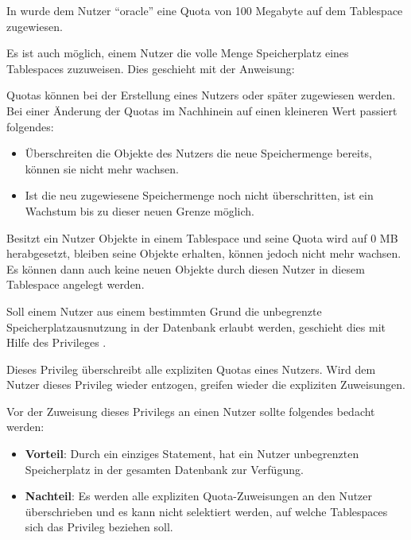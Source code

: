           In  wurde dem Nutzer \enquote{oracle} eine Quota von 100 Megabyte auf dem Tablespace  zugewiesen.
          \begin{merke}
            Es ist auch möglich, einem Nutzer die volle Menge Speicherplatz eines Tablespaces zuzuweisen. Dies geschieht mit der Anweisung: 
          \end{merke}

          Quotas können bei der Erstellung eines Nutzers oder später zugewiesen werden. Bei einer Änderung der Quotas im Nachhinein auf einen kleineren Wert passiert folgendes:
          \begin{itemize}
            \item Überschreiten die Objekte des Nutzers die neue Speichermenge bereits, können sie nicht mehr wachsen.
            \item Ist die neu zugewiesene Speichermenge noch nicht überschritten, ist ein Wachstum bis zu dieser neuen Grenze möglich.
          \end{itemize}
          Besitzt ein Nutzer Objekte in einem Tablespace und seine Quota wird auf 0 MB herabgesetzt, bleiben seine Objekte erhalten, können jedoch nicht mehr wachsen. Es können dann auch keine neuen Objekte durch diesen Nutzer in diesem Tablespace angelegt werden.

          Soll einem Nutzer aus einem bestimmten Grund die unbegrenzte Speicherplatzausnutzung in der Datenbank erlaubt werden, geschieht dies mit Hilfe des Privileges .
          \begin{merke}
            Dieses Privileg überschreibt alle expliziten Quotas eines Nutzers. Wird dem Nutzer dieses Privileg wieder entzogen, greifen wieder die expliziten Zuweisungen.
          \end{merke}
          Vor der Zuweisung dieses Privilegs an einen Nutzer sollte folgendes bedacht werden:
          \begin{itemize}
            \item \textbf{Vorteil}: Durch ein einziges Statement, hat ein Nutzer unbegrenzten Speicherplatz in der gesamten Datenbank zur Verfügung.
            \item \textbf{Nachteil}: Es werden alle expliziten  Quota-Zuweisungen an den Nutzer überschrieben und es kann nicht selektiert werden, auf welche Tablespaces sich das Privileg  beziehen soll.
          \end{itemize}
